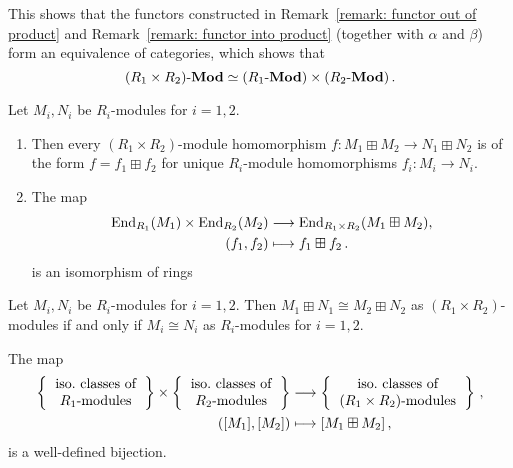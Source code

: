 

\begin{remark}
  This shows that the functors constructed in Remark~\ref{remark: functor out of product} and Remark~\ref{remark: functor into product} (together with $\alpha$ and $\beta$) form an equivalence of categories, which shows that
  \[
            (R_1 \times R_2)\text{-}\mathbf{Mod}
    \simeq  (R_1\text{-}\mathbf{Mod}) \times (R_2\text{-}\mathbf{Mod}) \,.
  \]
\end{remark}


\begin{corollary}
  \label{label: endomorphism ring of boxsum}
  Let $M_i, N_i$ be $R_i$-modules for $i = 1, 2$.
  \begin{enumerate}
    \item
      Then every $(R_1 \times R_2)$-module homomorphism $f \colon M_1 \boxplus M_2 \to N_1 \boxplus N_2$ is of the form $f = f_1 \boxplus f_2$ for unique $R_i$-module homomorphisms $f_i \colon M_i \to N_i$.
    \item
      The map
      \begin{align*}
                  \operatorname{End}_{R_1}(M_1) \times \operatorname{End}_{R_2}(M_2)
        &\longrightarrow  \operatorname{End}_{R_1 \times R_2}(M_1 \boxplus M_2),
        \\
                      (f_1, f_2)
        &\longmapsto  f_1 \boxplus f_2 \,.
      \end{align*}
      is an isomorphism of rings
  \end{enumerate}
\end{corollary}




\begin{corollary}
  Let $M_i, N_i$ be $R_i$-modules for $i = 1, 2$.
  Then $M_1 \boxplus N_1 \cong M_2 \boxplus N_2$ as $(R_1 \times R_2)$-modules if and only if $M_i \cong N_i$ as $R_i$-modules for $i = 1, 2$.
\end{corollary}




\begin{corollary}
  \label{corollary: isomorphism classes of modules over products}
  The map
  \begin{align*}
    \left\{
      \begin{tabular}{c}
        iso.\ classes of  \\
        $R_1$-modules
      \end{tabular}
    \right\}
    \times
    \left\{
      \begin{tabular}{c}
        iso.\ classes of  \\
        $R_2$-modules
      \end{tabular}
    \right\}
    &\longto
    \left\{
      \begin{tabular}{c}
        iso.\ classes of \\
        $(R_1 \times R_2)$-modules
      \end{tabular}
    \right\} \,,
    \\
    ( [M_1], [M_2] )
    &\longmapsto
    [M_1 \boxplus M_2] \,,
  \end{align*}
  is a well-defined bijection.
\end{corollary}


